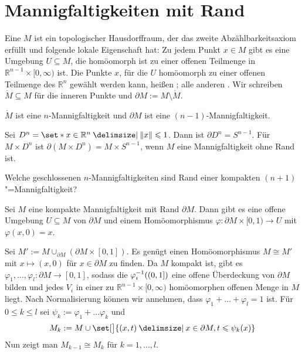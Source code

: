 \section{Mannigfaltigkeiten mit Rand} %
\label{sec:9}
\begin{definition}[{name=[Mannigfaltigkeit mit Rand]}]
	Eine  $M$ ist ein topologischer Hausdorffraum, der das zweite Abzählbarkeitsaxiom erfüllt und folgende lokale Eigenschaft hat: 
	Zu jedem Punkt $x \in M$ gibt es eine Umgebung $U \subseteq M$, die homöomorph ist zu einer offenen Teilmenge in $\mathbb{R}^{n-1} \times [0,\infty)$ ist.
	Die Punkte $x$, für die $U$ homöomorph zu einer offenen Teilmenge des $\mathbb{R}^n$ gewählt werden kann, heißen ; alle anderen .
	Wir schreiben $\mathring{M} \subseteq M$ für die inneren Punkte und $\partial M := M \setminus \mathring{M}$.  
\end{definition}

\begin{bemerkung}[{name=[Der Rand ist eine $(n-1)$-Mannigfaltigkeit]}]
	$\mathring{M}$ ist eine $n$-Mannigfaltigkeit und $\partial M$ ist eine $(n-1)$-Mannigfaltigkeit.
\end{bemerkung}

\begin{beispiel}[{name=[Mannigfaltigkeit mit Rand]}]
	Sei $D^n = \set*{x \in \mathbb{R}^n \given \norm*{x}\le 1}$. Dann ist $\partial D^n = S^{n-1}$.
	Für $M \times D^n$ ist $\partial (M \times D^n) = M \times S^{n-1}$, wenn $M$ eine Mannigfaltigkeit ohne Rand ist.
\end{beispiel}

\begin{frage}
	Welche geschlossenen $n$-Mannigfaltigkeiten sind Rand einer kompakten $(n+1)$"=Mannigfaltigkeit?
\end{frage}

\begin{satz}[name={Kragensatz},label=kragensatz]
	Sei $M$ eine kompakte Mannigfaltigkeit mit Rand $\partial M$. 
	Dann gibt es eine offene Umgebung $U \subseteq M$ von $\partial M$ und einem Homöomorphismus $\varphi \colon \partial M \times [0,1) \to U$ mit ${\varphi(x,0)=x}$.
\end{satz}
\begin{beweis}[name={Skizze}]
	Sei $M' := M \cup_{\partial M} (\partial M \times [0,1])$.
	Es genügt einen Homöomorphismus $M \cong M'$ mit $x \mapsto (x,0)$ für $x \in \partial M$ zu finden. 
	Da $M$ kompakt ist, gibt es $\varphi_1, \ldots , \varphi_l \colon \partial M \to [0,1]$, sodass die $\varphi_i^{-1}\enbrace*{(0,1]}$ eine offene Überdeckung von $\partial M$ bilden und jedes $V_i$ in einer zu $\mathbb{R}^{n-1} \times [0,\infty)$ homöomorphen offenen Menge in $M$ liegt. 
	Nach Normalisierung können wir annehmen, dass $\varphi_1 + \ldots + \varphi_l =1$ ist.
	Für $0 \le k \le l$ sei $\psi_k := \varphi_1 + \ldots \varphi_k$ und 
	\[
		M_k := M \cup \set[\big]{(x,t) \given x \in \partial M, t \le \psi_k(x)}
	\]
	Nun zeigt man $M_{k-1} \cong M_k$ für $k=1,\ldots ,l$.
\end{beweis}

